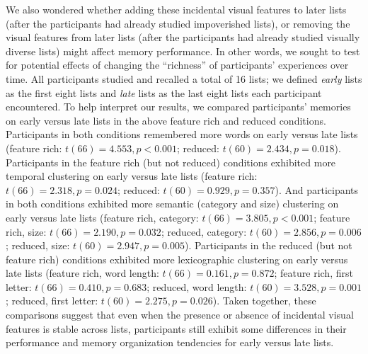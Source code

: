 \documentclass[11pt]{article}
\begin{document}
We also wondered whether adding these incidental visual features to later lists
(after the participants had already studied impoverished lists), or removing
the visual features from later lists (after the participants had already
studied visually diverse lists) might affect memory performance. In other
words, we sought to test for potential effects of changing the ``richness'' of
participants' experiences over time. All participants studied and recalled a
total of 16 lists; we defined \textit{early} lists as the first eight lists and
\textit{late} lists as the last eight lists each participant encountered. To
help interpret our results, we compared participants' memories on early versus
late lists in the above feature rich and reduced conditions. Participants in
both conditions remembered more words on early versus late lists (feature rich:
$t(66) = 4.553, p < 0.001$; reduced: $t(60) = 2.434, p = 0.018$). Participants
in the feature rich (but not reduced) conditions exhibited more temporal
clustering on early versus late lists (feature rich: $t(66) = 2.318, p =
0.024$; reduced: $t(60) = 0.929, p = 0.357$). And participants in both
conditions exhibited more semantic (category and size) clustering on early
versus late lists (feature rich, category: $t(66) = 3.805, p < 0.001$; feature
rich, size: $t(66) = 2.190, p = 0.032$; reduced, category: $t(60) = 2.856, p =
0.006$; reduced, size: $t(60) = 2.947, p = 0.005$). Participants in the reduced
(but not feature rich) conditions exhibited more lexicographic clustering on
early versus late lists (feature rich, word length: $t(66) = 0.161, p = 0.872$;
feature rich, first letter: $t(66) = 0.410, p = 0.683$; reduced, word length:
$t(60) = 3.528, p = 0.001$; reduced, first letter: $t(60) = 2.275, p = 0.026$).
Taken together, these comparisons suggest that even when the presence or
absence of incidental visual features is stable across lists, participants
still exhibit some differences in their performance and memory organization
tendencies for early versus late lists.
\end{document}
